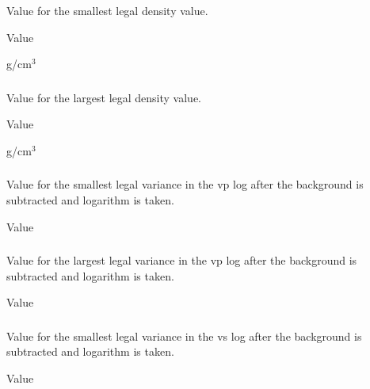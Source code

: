 \subsubsection{}
 \slist
   \item \Description Value for the smallest legal density value.
   \item \Argument Value
   \item {} g/cm$^3$
\elist

\subsubsection{}
 \slist
   \item \Description Value for the largest legal density value.
   \item \Argument Value
   \item {} g/cm$^3$
 \elist

\subsubsection{}
 \slist
   \item \Description Value for the smallest legal variance in the vp log after the background is subtracted and logarithm is taken.
   \item \Argument Value
   \item {}
 \elist

\subsubsection{}
 \slist
   \item \Description Value for the largest legal variance in the vp log after the background is subtracted and logarithm is taken.
   \item \Argument Value
   \item {}
 \elist

\subsubsection{}
 \slist
   \item \Description Value for the smallest legal variance in the vs log after the background is subtracted and logarithm is taken.
   \item \Argument Value
   \item {}
 \elist

